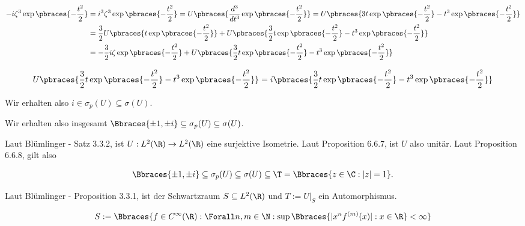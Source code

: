 \begin{solution}
\begin{itemize}
  \begin{align*}
    -i \zeta^3 \exp \pbraces{-\frac{t^2}{2}}
    & =
    i^3 \zeta^3 \exp \pbraces{-\frac{t^2}{2}}
    =
    U \pbraces
    {
      \frac{d^3}{dt^3}
      \exp \pbraces{-\frac{t^2}{2}}
    }
    =
    U \pbraces
    {
      3 t \exp \pbraces{-\frac{t^2}{2}} -
      t^3 \exp \pbraces{-\frac{t^2}{2}}
    } \\
    & =
    \frac{3}{2}
    U \pbraces{t \exp \pbraces{-\frac{t^2}{2}}} +
    U \pbraces
    {
      \frac{3}{2}
      t \exp \pbraces{-\frac{t^2}{2}} -
      t^3 \exp \pbraces{-\frac{t^2}{2}}
    } \\
    & =
    -\frac{3}{2} i \zeta \exp \pbraces{-\frac{t^2}{2}} +
    U \pbraces
    {
      \frac{3}{2}
      t \exp \pbraces{-\frac{t^2}{2}} -
      t^3 \exp \pbraces{-\frac{t^2}{2}}
    }
  \end{align*}

  \begin{align*}
    U \pbraces
    {
      \frac{3}{2}
      t \exp \pbraces{-\frac{t^2}{2}} -
      t^3 \exp \pbraces{-\frac{t^2}{2}}
    }
    =
    i \pbraces
    {
      \frac{3}{2} t \exp \pbraces{-\frac{t^2}{2}} -
      t^3 \exp \pbraces{-\frac{t^2}{2}}
    }
  \end{align*}

  Wir erhalten also $i \in \sigma_p(U) \subseteq \sigma(U)$. \\
\end{itemize}


Wir erhalten also insgesamt $\Bbraces{\pm 1, \pm i} \subseteq \sigma_p(U) \subseteq \sigma(U)$.
\FloatBarrier
{}
\FloatBarrier

Laut Blümlinger - Satz 3.3.2, ist $U: L^2(\R) \to L^2(\R)$ eine surjektive Isometrie.
Laut Proposition 6.6.7, ist $U$ also unitär.
Laut Proposition 6.6.8, gilt also

\begin{align*}
  \Bbraces{\pm 1, \pm i}
  \subseteq
  \sigma_p(U)
  \subseteq
  \sigma(U)
  \subseteq
  \T
  =
  \Bbraces{z \in \C: |z| = 1}.
\end{align*}


Laut Blümlinger - Proposition 3.3.1, ist der Schwartzraum $S \subseteq L^2(\R)$ und $T := U|_S$ ein Automorphismus.

\begin{align*}
  S
  :=
  \Bbraces
  {
    f \in C^\infty(\R):
    \Forall n, m \in \N:
    \sup \Bbraces{|x^n f^{(m)}(x)| : x \in \R} < \infty
  }
\end{align*}


\end{solution}
